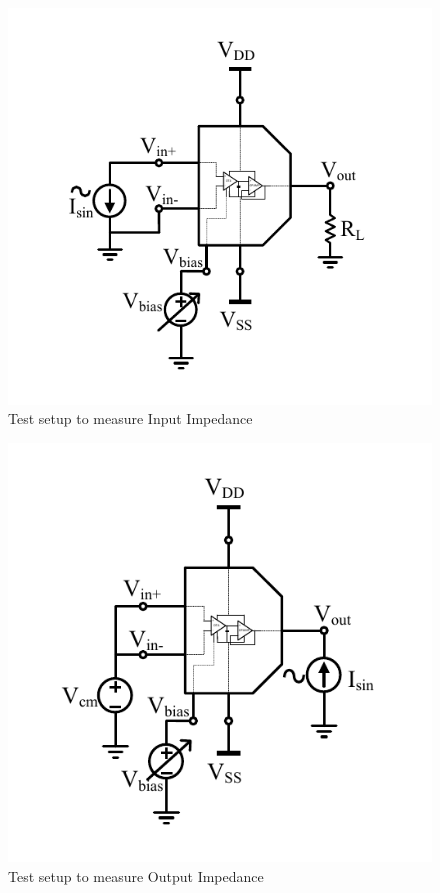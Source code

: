 \begin{figure} [H]
\centering
\includegraphics[scale=1]{Figures/Test_Benches/Overall/ZIN.pdf}
\caption{Test setup to measure Input Impedance}
\end{figure}

\begin{figure} [H]
\centering
\includegraphics[scale=1]{Figures/Test_Benches/Overall/ZOUT.pdf}
\caption{Test setup to measure Output Impedance}
\end{figure}

